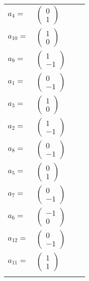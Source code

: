 \documentclass[1p]{elsarticle_modified}
\theoremstyle{definition}
\begin{document}
\begin{tabular}{m{7pt} m{180pt} m{7pt} m{180pt} }
\flushright $a_{4}=$&$\begin{pmatrix}0\\1\end{pmatrix}$ \\
\flushright $a_{10}=$&$\begin{pmatrix}1\\0\end{pmatrix}$ \\
\flushright $a_{9}=$&$\begin{pmatrix}1\\-1\end{pmatrix}$ \\
\flushright $a_{1}=$&$\begin{pmatrix}0\\-1\end{pmatrix}$ \\
\flushright $a_{3}=$&$\begin{pmatrix}1\\0\end{pmatrix}$ \\
\flushright $a_{2}=$&$\begin{pmatrix}1\\-1\end{pmatrix}$ \\
\flushright $a_{8}=$&$\begin{pmatrix}0\\-1\end{pmatrix}$ \\
\flushright $a_{5}=$&$\begin{pmatrix}0\\1\end{pmatrix}$ \\
\flushright $a_{7}=$&$\begin{pmatrix}0\\-1\end{pmatrix}$ \\
\flushright $a_{6}=$&$\begin{pmatrix}-1\\0\end{pmatrix}$ \\
\flushright $a_{12}=$&$\begin{pmatrix}0\\-1\end{pmatrix}$ \\
\flushright $a_{11}=$&$\begin{pmatrix}1\\1\end{pmatrix}$\\&\end{tabular}
\end{document}
